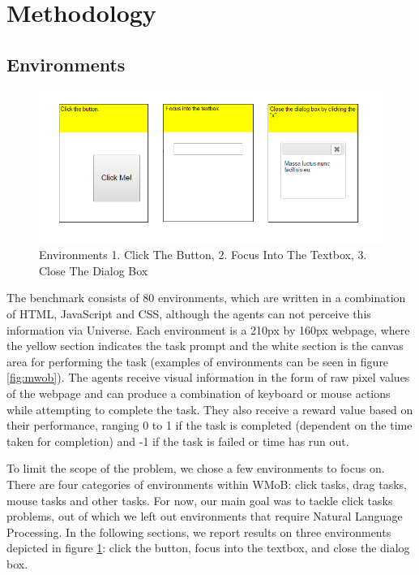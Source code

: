 \documentclass[10pt,journal,compsoc]{IEEEtran}
\begin{document}
\section{Methodology}

\subsection{Environments}

\begin{figure}[h!]
	\includegraphics[width=\linewidth]{chosen-envi.png}
	\caption{Environments 1. Click The Button, 2. Focus Into The Textbox, 3. Close The Dialog Box}
	\label{fig:chosen-envi}
\end{figure}

The benchmark consists of 80 environments, which are written in a combination of HTML, JavaScript and CSS, although the agents can not perceive this information via Universe. Each environment is a 210px by 160px webpage, where the yellow section indicates the task prompt and the white section is the canvas area for performing the task (examples of environments can be seen in figure \ref{fig:mwob}). The agents receive visual information in the form of raw pixel values of the webpage and can produce a combination of keyboard or mouse actions while attempting to complete the task. They also receive a reward value based on their performance, ranging 0 to 1 if the task is completed (dependent on the time taken for completion) and -1 if the task is failed or time has run out.

To limit the scope of the problem, we chose a few environments to focus on. There are four categories of environments within WMoB: click tasks, drag tasks, mouse tasks and other tasks. For now, our main goal was to tackle click tasks problems, out of which we left out environments that require Natural Language Processing. In the following sections, we report results on three environments depicted in figure \ref{fig:chosen-envi}: click the button, focus into the textbox, and close the dialog box.
\end{document}
